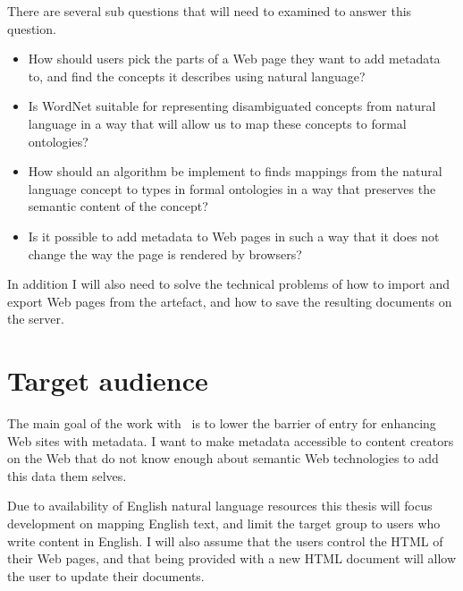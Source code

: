 There are several sub questions that will need to examined to answer this question.
\begin{itemize}
	\item How should users pick the parts of a Web page they want to add metadata to, and find the concepts it describes using natural language?
	\item Is WordNet suitable for representing disambiguated concepts from natural language in a way that will allow us to map these concepts to formal ontologies?
	\item How should an algorithm be implement to finds mappings from the natural language concept to types in
			formal ontologies in a way that preserves the semantic content of the concept?
	\item Is it possible to add metadata to Web pages in such a way that it does not change the way the page is rendered by browsers?
\end{itemize}

In addition I will also need to solve the technical problems of how to import and export Web pages from the artefact,
and how to save the resulting documents on the server.

\section{Target audience}
The main goal of the work with \theartefact\ is to lower the barrier of entry for enhancing Web sites with metadata.
I want to make metadata accessible to content creators on the Web that do not know enough about semantic Web technologies
to add this data them selves.

Due to availability of English natural language resources this thesis will focus development on mapping English text,
and limit the target group to users who write content in English.
I will also assume that the users control the HTML of their Web pages,
and that being provided with a new HTML document will allow the user to update their documents.

